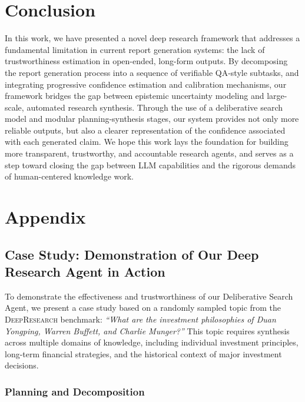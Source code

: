 \documentclass[11pt]{article}
\begin{document}
\section{Conclusion}
In this work, we have presented a novel deep research framework that addresses a fundamental limitation in current report generation systems: the lack of trustworthiness estimation in open-ended, long-form outputs. By decomposing the report generation process into a sequence of verifiable QA-style subtasks, and integrating progressive confidence estimation and calibration mechanisms, our framework bridges the gap between epistemic uncertainty modeling and large-scale, automated research synthesis. Through the use of a deliberative search model and modular planning-synthesis stages, our system provides not only more reliable outputs, but also a clearer representation of the confidence associated with each generated claim. We hope this work lays the foundation for building more transparent, trustworthy, and accountable research agents, and serves as a step toward closing the gap between LLM capabilities and the rigorous demands of human-centered knowledge work.




\appendix
\onecolumn
\section{Appendix}

\subsection{Case Study: Demonstration of Our Deep Research Agent in Action}
\label{sec:agent-demonstration}
To demonstrate the effectiveness and trustworthiness of our Deliberative Search Agent, we present a case study based on a randomly sampled topic from the \textsc{DeepResearch} benchmark:
\textit{“What are the investment philosophies of Duan Yongping, Warren Buffett, and Charlie Munger?”}
This topic requires synthesis across multiple domains of knowledge, including individual investment principles, long-term financial strategies, and the historical context of major investment decisions.

\subsubsection{Planning and Decomposition}
\end{document}
